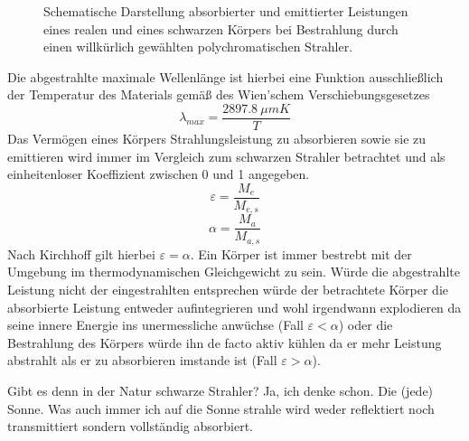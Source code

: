 \begin{figure}[h]
    \caption{Schematische Darstellung absorbierter und emittierter Leistungen eines realen und eines schwarzen Körpers bei Bestrahlung durch einen willkürlich gewählten polychromatischen Strahler.}
    \label{fig:eingestrahlt}
\end{figure}

Die abgestrahlte maximale Wellenlänge ist hierbei eine Funktion ausschließlich der Temperatur des Materials gemäß des
Wien'schem Verschiebungsgesetzes
\begin{equation}
    \lambda_{max}=\frac{\SI{2897,8}{\mu mK}}{T}
\end{equation}
Das Vermögen eines Körpers Strahlungsleistung zu absorbieren sowie sie zu emittieren wird immer im Vergleich zum
schwarzen Strahler betrachtet und als einheitenloser Koeffizient zwischen 0 und 1 angegeben.
\begin{equation}
    \varepsilon = \frac{M_e}{M_{e,s}}
\end{equation}
\begin{equation}
    \alpha = \frac{M_a}{M_{a,s}}
\end{equation}
Nach Kirchhoff gilt hierbei \(\varepsilon = \alpha\).
Ein Körper ist immer bestrebt mit der Umgebung im thermodynamischen Gleichgewicht zu sein. Würde die abgestrahlte Leistung
nicht der eingestrahlten entsprechen würde der betrachtete Körper die absorbierte Leistung entweder aufintegrieren und
wohl irgendwann explodieren da seine innere Energie ins unermessliche anwüchse (Fall \(\varepsilon < \alpha\)) oder
die Bestrahlung des Körpers würde ihn de facto aktiv kühlen da er mehr Leistung abstrahlt als er zu absorbieren imstande
ist (Fall \(\varepsilon > \alpha\)).

Gibt es denn in der Natur schwarze Strahler? Ja, ich denke schon. Die (jede) Sonne. Was auch immer ich auf die Sonne
strahle wird weder reflektiert noch transmittiert sondern vollständig absorbiert.